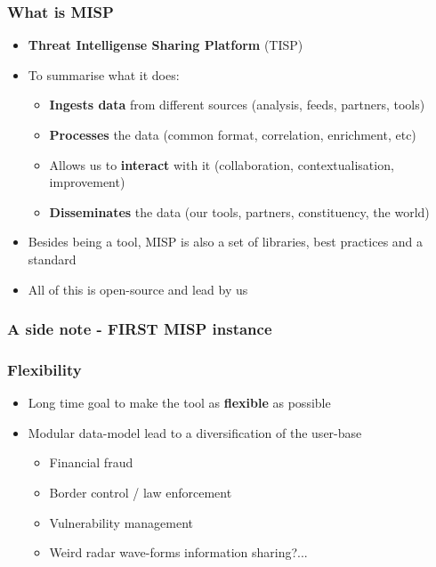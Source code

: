 \begin{frame}
 \frametitle{What is MISP}
 \begin{itemize}
         \item {\bf Threat Intelligense Sharing Platform} (TISP)
         \item To summarise what it does:
         \begin{itemize}
             \item {\bf Ingests data} from different sources (analysis, feeds, partners, tools)
             \item {\bf Processes} the data (common format, correlation, enrichment, etc)
             \item Allows us to {\bf interact} with it (collaboration, contextualisation, improvement)
             \item {\bf Disseminates} the data (our tools, partners, constituency, the world)
         \end{itemize}
         \item Besides being a tool, MISP is also a set of libraries, best practices and a standard
         \item All of this is open-source and lead by us
 \end{itemize}
\end{frame}

\begin{frame}
 \frametitle{A side note - FIRST MISP instance}
\end{frame}

\begin{frame}
 \frametitle{Flexibility}
 \begin{itemize}
         \item Long time goal to make the tool as {\bf flexible} as possible
         \item Modular data-model lead to a diversification of the user-base
         \begin{itemize}
             \item Financial fraud
             \item Border control / law enforcement
             \item Vulnerability management
             \item Weird radar wave-forms information sharing?...
         \end{itemize}
 \end{itemize}
\end{frame}

